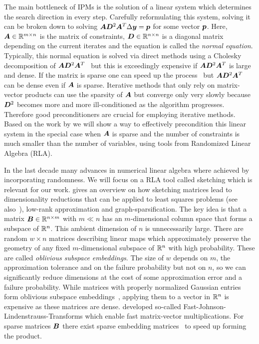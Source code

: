 The main bottleneck of IPMs is the solution of a linear system which determines the search direction in every step.
Carefully reformulating this system, solving it can be broken down to solving \(\bm{A} \bm{D}^2 \bm{A}^T \Delta \bm{y} = \bm{p}\) for some vector \(\bm{p}\).
Here, \(\bm{A} \in \mathbb{R}^{m \times n}\) is the matrix of constraints, \(\bm{D} \in \mathbb{R}^{n \times n}\) is a diagonal matrix depending on the current iterates and the equation is called the \emph{normal equation}.
Typically, this normal equation is solved via direct methods using a Cholesky decomposition of \(\bm{A} \bm{D}^2 \bm{A}^T\)~\cite[p. 17]{Wright-PrimalDualInteriorPointMethods} but this is exceedingly expensive if \(\bm{A} \bm{D}^2 \bm{A}^T\) is large and dense.
If the matrix is sparse one can speed up the process~\cite{NgPeyton-SparseCholesky} but \(\bm{A} \bm{D}^2 \bm{A}^T\) can be dense even if \(\bm{A}\) is sparse.
Iterative methods that only rely on matrix-vector products can use the sparsity of \(\bm{A}\) but converge only very slowly because \(\bm{D}^2\) becomes more and more ill-conditioned as the algorithm progresses.
Therefore good preconditioners are crucial for employing iterative methods.
Based on the work by \textcite{Avron-FasterRandomizedInfeasibleIPMs} we will show a way to effectively precondition this linear system in the special case when \(\bm{A}\) is sparse and the number of constraints is much smaller than the number of variables, using tools from Randomized Linear Algebra (RLA).

In the last decade many advances in numerical linear algebra where achieved by incorporating randomness.
We will focus on a RLA tool called sketching which is relevant for our work.
\textcite{Woodruff-Sketching} gives an overview on how sketching matrices lead to dimensionality reductions that can be applied to least squares problems (see also~\cite{Avron-Blendenpik}), low-rank approximation and graph-sparsification.
The key idea is that a matrix \(\bm{B} \in \mathbb{R}^{n \times m}\) with \(m \ll n\) has an \(m\)-dimensional column space that forms a subspace of \(\mathbb{R}^n\).
This ambient dimension of \(n\) is unnecessarily large.
There are random \(w \times n\) matrices describing linear maps which approximately preserve the geometry of any fixed \(m\)-dimensional subspace of \(\mathbb{R}^n\) with high probability.
These are called \emph{oblivious subspace embeddings}.
The size of \(w\) depends on \(m\), the approximation tolerance and on the failure probability but not on \(n\), so we can significantly reduce dimensions at the cost of some approximation error and a failure probability.
While matrices with properly normalized Gaussian entries form oblivious subspace embeddings~\cite[Theorem 6]{Woodruff-Sketching}, applying them to a vector in \(\mathbb{R}^n\) is expensive as these matrices are dense.
\textcite{AilonChazelle-FastJohnsonLindenstraussTransform} developed so-called Fast-Johnson-Lindenstrauss-Transforms which enable fast matrix-vector multiplications. For sparse matrices \(\bm{B}\) there exist sparse embedding matrices~\cite{Achlioptas-SparseSketching,Cohen-NearlyTightObliviousSubspaceEmbeddings} to speed up forming the product.


